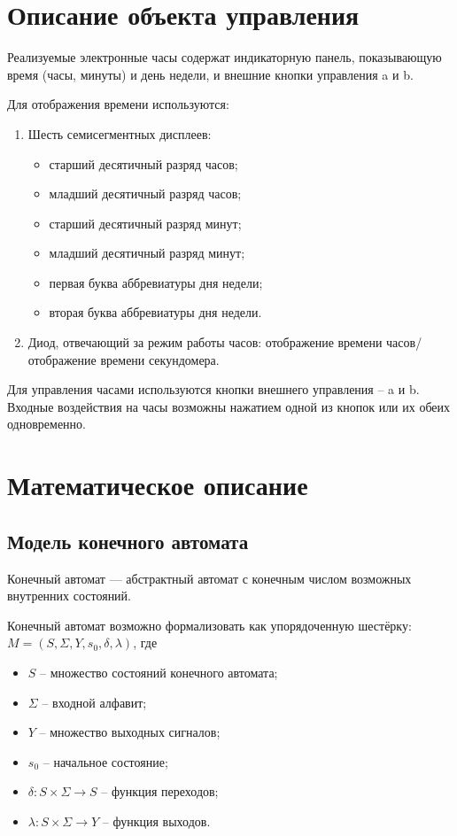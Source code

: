 \documentclass[a4paper, final]{article}
\begin{document}
\newpage
\section{Описание объекта управления}
Реализуемые электронные часы содержат индикаторную панель, показывающую время (часы, минуты) и день недели, и внешние кнопки управления a и b.

Для отображения времени используются:
\begin{enumerate}
  \item Шесть семисегментных дисплеев:
  \begin{itemize}
    \item старший десятичный разряд часов;
    \item младший десятичный разряд часов;
    \item старший десятичный разряд минут;
    \item младший десятичный разряд минут;
    \item первая буква аббревиатуры дня недели;
    \item вторая буква аббревиатуры дня недели.
  \end{itemize}
  
  \item Диод, отвечающий за режим работы часов: отображение времени часов/отображение времени секундомера.
\end{enumerate}

Для управления часами используются кнопки внешнего управления -- a и b. Входные воздействия на часы возможны нажатием одной из кнопок или их обеих одновременно.

\newpage
\section{Математическое описание}
\subsection{Модель конечного автомата}
Конечный автомат --- абстрактный автомат с конечным числом возможных внутренних состояний. 

Конечный автомат возможно формализовать как упорядоченную шестёрку: $M = (S, \Sigma, Y, s_0, \delta, \lambda)$, где
\begin{itemize}
  \item $S$ -- множество состояний конечного автомата;
  \item $\Sigma$ -- входной алфавит;
  \item $Y$ -- множество выходных сигналов;
  \item $s_0$ -- начальное состояние;
  \item $\delta : S \times \Sigma \rightarrow S$ -- функция переходов;
  \item $\lambda : S \times \Sigma \rightarrow Y$ -- функция выходов. 
\end{itemize}
\end{document}
